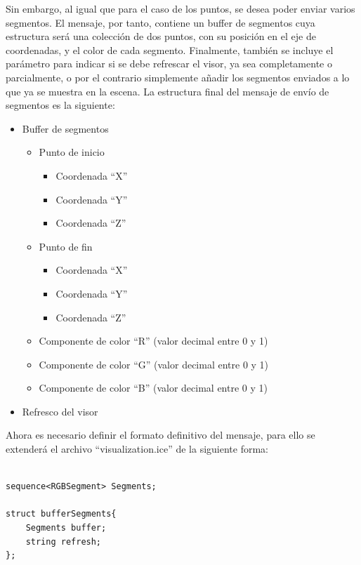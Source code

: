 Sin embargo, al igual que para el caso de los puntos, se desea poder enviar varios segmentos. El mensaje, por tanto, contiene un buffer de segmentos cuya estructura será una colección de dos puntos, con su posición en el eje de coordenadas, y el color de cada segmento.
Finalmente, también se incluye el parámetro para indicar si se debe refrescar el visor, ya sea completamente o parcialmente, o por el contrario simplemente añadir los segmentos enviados a lo que ya se muestra en la escena.
La estructura final del mensaje de envío de segmentos es la siguiente:
\begin{itemize}
	\item Buffer de segmentos
	\begin{itemize}
		\item Punto de inicio
		\begin{itemize}
			\item Coordenada ``X''
			\item Coordenada ``Y''
			\item Coordenada ``Z''
		\end{itemize}
		\item Punto de fin
		\begin{itemize}
			\item Coordenada ``X''
			\item Coordenada ``Y''
			\item Coordenada ``Z''
		\end{itemize}
		\item Componente de color ``R'' (valor decimal entre 0 y 1)
		\item Componente de color ``G'' (valor decimal entre 0 y 1)
		\item Componente de color ``B'' (valor decimal entre 0 y 1)
	\end{itemize}
	\item Refresco del visor
\end{itemize}

Ahora es necesario definir el formato definitivo del mensaje, para ello se extenderá el archivo ``visualization.ice'' de la siguiente forma:

\begin{lstlisting}[caption= Definición del buffer de segmentos con Slice, label=cod.buffersgmslice]
	
sequence<RGBSegment> Segments;
	
struct bufferSegments{
	Segments buffer;
	string refresh;
};
\end{lstlisting}

